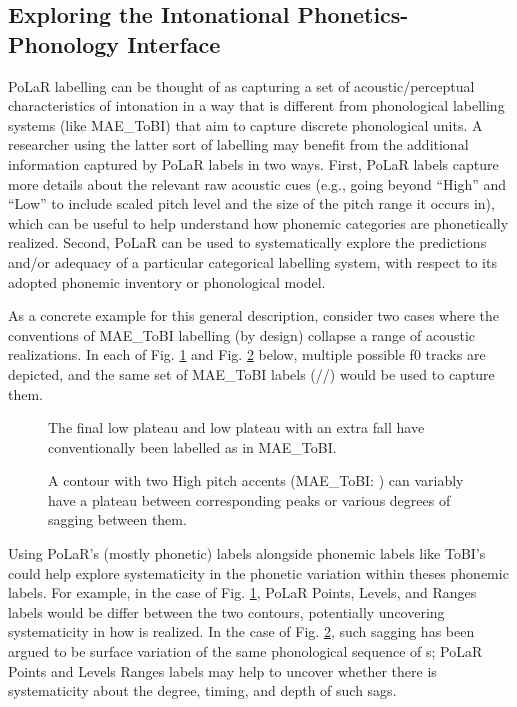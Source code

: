 \subsection{Exploring the Intonational Phonetics-Phonology Interface}\label{sec:exploring-phonetics-phonology-interface}
PoLaR labelling can be thought of as capturing a set of acoustic\slash perceptual characteristics of intonation in a way that is different from phonological labelling systems (like MAE\_ToBI) that aim to capture discrete phonological units. A researcher using the latter sort of labelling may benefit from the additional information captured by PoLaR labels in two ways. First, PoLaR labels capture more details about the relevant raw acoustic cues (e.g., going beyond “High” and “Low” to include scaled pitch level and the size of the pitch range it occurs in), which can be useful to help understand how phonemic categories are phonetically realized. Second, PoLaR can be used to systematically explore the predictions and/or adequacy of a particular categorical labelling system, with respect to its adopted phonemic inventory or phonological model.

As a concrete example for this general description, consider two cases where the conventions of MAE\_ToBI labelling (by design) collapse a range of acoustic realizations. In each of Fig. \ref{fig:final low Usages} and Fig. \ref{fig:sagging Usages} below, multiple possible f0 tracks are depicted, and the same set of MAE\_ToBI labels (//) would be used to capture them.

\begin{figure}[H]
\centering
%

%
\caption{The final low plateau and low plateau with an extra fall have conventionally been labelled as  in MAE\_ToBI.%
\label{fig:final low Usages}%
}
\end{figure}

\begin{figure}[H]
\centering
%

%
\caption{A contour with two High pitch accents (MAE\_ToBI: ) can variably have a plateau between corresponding peaks or various degrees of sagging between them.%
\label{fig:sagging Usages}%
}
\end{figure}

Using PoLaR’s (mostly phonetic) labels alongside phonemic labels like ToBI’s could help explore systematicity in the phonetic variation within theses phonemic labels. For example, in the case of Fig. \ref{fig:final low Usages}, PoLaR Points, Levels, and Ranges labels would be differ between the two contours, potentially uncovering systematicity in how  is realized. In the case of Fig. \ref{fig:sagging Usages}, such sagging has been argued to be surface variation of the same phonological sequence of s; PoLaR Points and Levels Ranges labels may help to uncover whether there is systematicity about the degree, timing, and depth of such sags.

